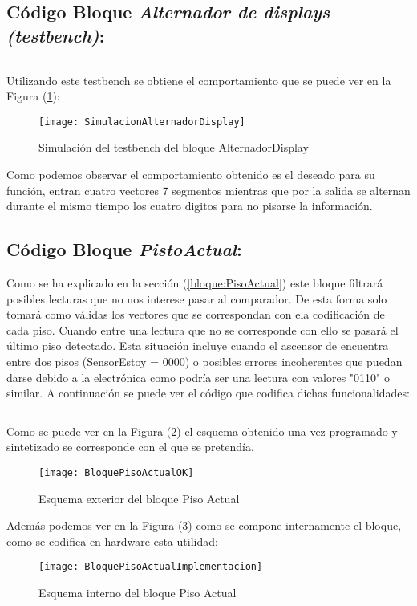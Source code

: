 \subsection{Código Bloque \textit{Alternador de displays (testbench)}:} \label{code:AlternadorDisplay_Tb}
	\inputminted[frame=lines,fontsize=\footnotesize,linenos]{vhdl}{CodeFiles/AlternadorDisplay_tb.vhd}
	
		Utilizando este testbench se obtiene el comportamiento que se puede ver en la Figura (\ref{fig:SimulacionAlternadorDisplay}):

    \begin{figure}[H]
		    \centering
		    \texttt{[image: SimulacionAlternadorDisplay]}
		    \caption{Simulación del testbench del bloque AlternadorDisplay}
		    \label{fig:SimulacionAlternadorDisplay}
	\end{figure}

	Como podemos observar el comportamiento obtenido es el deseado para su función, entran cuatro vectores 7 segmentos mientras que por la salida se alternan durante el mismo tiempo los cuatro digitos para no pisarse la información.

\subsection{Código Bloque \textit{PistoActual}:} \label{code:PisoActual}
	Como se ha explicado en la sección (\ref{bloque:PisoActual}) este bloque filtrará posibles lecturas que no nos interese pasar al comparador. De esta forma solo tomará como válidas los vectores que se correspondan con ela codificación de cada piso. Cuando entre una lectura que no se corresponde con ello se pasará el último piso detectado. Esta situación incluye cuando el ascensor de encuentra entre dos pisos (SensorEstoy = 0000) o posibles errores incoherentes que puedan darse debido a la electrónica como podría ser una lectura con valores "0110" o similar. A continuación se puede ver el código que codifica dichas funcionalidades: \\ 

    \inputminted[frame=lines,fontsize=\footnotesize,linenos]{vhdl}{CodeFiles/PisoActual.vhd}
    
    Como se puede ver en la Figura (\ref{fig:BloquePisoActualOK}) el esquema obtenido una vez programado y sintetizado se corresponde con el que se pretendía.
    \begin{figure}[H]
		    \centering
		    \texttt{[image: BloquePisoActualOK]}
		    \caption{Esquema exterior del bloque Piso Actual}
		    \label{fig:BloquePisoActualOK}
	\end{figure}
    Además podemos ver en la Figura (\ref{fig:BloquePisoActualImplementacion}) como se compone internamente el bloque, como se codifica en hardware esta utilidad:
    \begin{figure}[H]
		    \centering
		    \texttt{[image: BloquePisoActualImplementacion]}
		    \caption{Esquema interno del bloque Piso Actual}
		    \label{fig:BloquePisoActualImplementacion}
	\end{figure}

